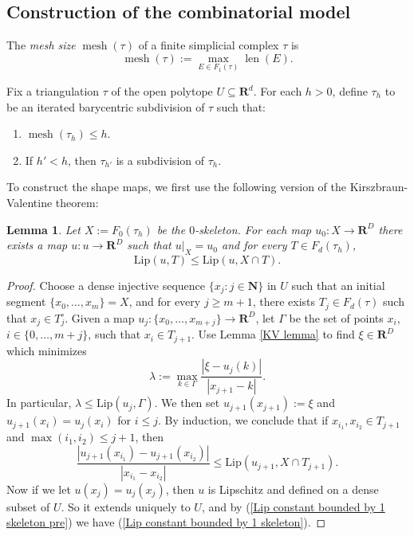 \documentclass[reqno,11pt]{amsart}
\newcommand{\NN}{\mathbf{N}}
\newcommand{\RR}{\mathbf{R}}
\DeclareMathOperator{\len}{len}
\DeclareMathOperator{\mesh}{mesh}
\newcommand{\Lip}{\mathrm{Lip}}
\newcommand{\dfn}[1]{\emph{#1}\index{#1}}
\newtheorem{lemma}[theorem]{Lemma}
\theoremstyle{definition}
\numberwithin{equation}{section}
\begin{document}
\subsection{Construction of the combinatorial model}
The \dfn{mesh size} $\mesh(\tau)$ of a finite simplicial complex $\tau$ is 
$$\mesh(\tau) := \max_{E \in F_1(\tau)} \len(E).$$

Fix a triangulation $\tau$ of the open polytope $U \subseteq \RR^d$.
For each $h > 0$, define $\tau_h$ to be an iterated barycentric subdivision of $\tau$ such that:
\begin{enumerate}
\item $\mesh(\tau_h) \leq h$.
\item If $h' < h$, then $\tau_{h'}$ is a subdivision of $\tau_h$.
\end{enumerate}
To construct the shape maps, we first use the following version of the Kirszbraun-Valentine theorem:

\begin{lemma}\label{convex KV theorem}
Let $X := F_0(\tau_h)$ be the $0$-skeleton.
For each map $u_0: X \to \RR^D$ there exists a map $u: u \to \RR^D$ such that $u|_X = u_0$ and for every $T \in F_d(\tau_h)$,
\begin{equation}\label{Lip constant bounded by 1 skeleton}
\Lip(u, T) \leq \Lip(u, X \cap T).
\end{equation}
\end{lemma}
\begin{proof}
Choose a dense injective sequence $\{x_j: j \in \NN\}$ in $U$ such that an initial segment $\{x_0, \dots, x_m\} = X$, and for every $j \geq m + 1$, there exists $T_j \in F_d(\tau)$ such that $x_j \in T^\circ_j$.
Given a map $u_j: \{x_0, \dots, x_{m + j}\} \to \RR^D$, let $\Gamma$ be the set of points $x_i$, $i \in \{0, \dots, m + j\}$, such that $x_i \in T_{j + 1}$.
Use Lemma \ref{KV lemma} to find $\xi \in \RR^D$ which minimizes
$$\lambda := \max_{k \in \Gamma} \frac{|\xi - u_j(k)|}{|x_{j + 1} - k|}.$$
In particular, $\lambda \leq \Lip(u_j, \Gamma)$.
We then set $u_{j + 1}(x_{j + 1}) := \xi$ and $u_{j + 1}(x_i) = u_j(x_i)$ for $i \leq j$.
By induction, we conclude that if $x_{i_1}, x_{i_2} \in T_{j + 1}$ and $\max(i_1, i_2) \leq j + 1$, then
\begin{equation}\label{Lip constant bounded by 1 skeleton pre}
\frac{|u_{j + 1}(x_{i_1}) - u_{j + 1}(x_{i_2})|}{|x_{i_1} - x_{i_2}|} \leq \Lip(u_{j + 1}, X \cap T_{j + 1}).
\end{equation}
Now if we let $u(x_j) = u_j(x_j)$, then $u$ is Lipschitz and defined on a dense subset of $U$.
So it extends uniquely to $U$, and by (\ref{Lip constant bounded by 1 skeleton pre}) we have (\ref{Lip constant bounded by 1 skeleton}).
\end{proof}
\end{document}
